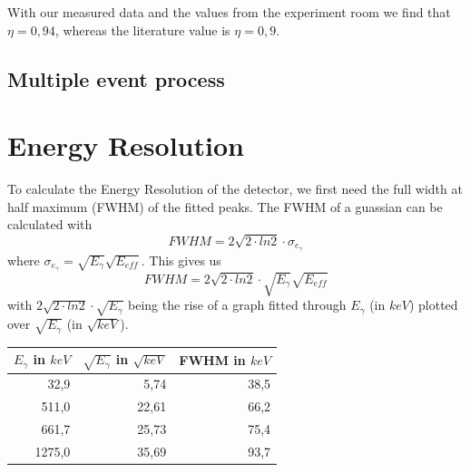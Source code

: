 \documentclass[bigchapter,colorback,accentcolor=tud4b,linedtoc,11pt]{tudreport}
\begin{document}
With our measured data and the values from the experiment room we find that $\eta = 0,94$, whereas the literature value is $\eta = 0,9$.

\subsection{Multiple event process}

\section{Energy Resolution}

To calculate the Energy Resolution of the detector, we first need the full width
at half maximum (FWHM) of the fitted peaks. The FWHM of a guassian can be
calculated with
$$FWHM = 2 \sqrt{2 \cdot ln2} \cdot \sigma_{e_{\gamma}}$$
where $\sigma_{e_{\gamma}} = \sqrt{E_\gamma}\sqrt{E_{eff}}$. This gives us
$$FWHM = 2 \sqrt{2 \cdot ln2} \cdot \sqrt{E_\gamma}\sqrt{E_{eff}}$$
with $2 \sqrt{2 \cdot ln2} \cdot \sqrt{E_\gamma}$ being the rise of a graph
fitted through $E_\gamma$ (in $keV$) plotted over $\sqrt{E_\gamma}$ (in $\sqrt{keV}$).

\begin{center}
  \begin{tabular}{r|r|r}
    $E_\gamma$ in $keV$ & $\sqrt{E_\gamma}$ in $\sqrt{keV}$ & FWHM in $keV$ \\ \hline
    32,9                & 5,74                              & 38,5          \\ \hline
    511,0               & 22,61                             & 66,2          \\ \hline
    661,7               & 25,73                             & 75,4          \\ \hline
    1275,0              & 35,69                             & 93,7          \\

	\end{tabular}
\end{center}

\begin{center}
\begin{figure}[H]
\end{figure}
\end{center}
\end{document}
